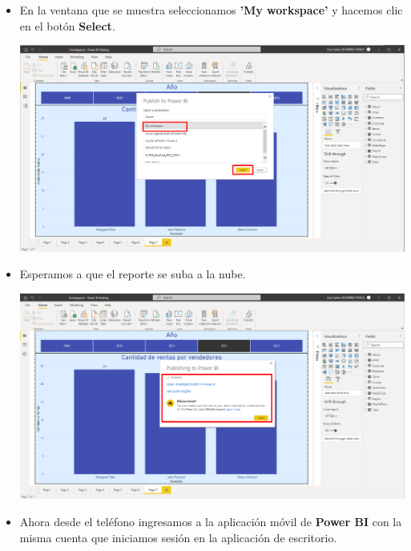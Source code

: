 \documentclass[12pt,letterpaper]{article}
\newcommand\tab[1][1cm]{\hspace*{#1}}
\begin{document}
\begin{enumerate}[\tab 1.]
\begin{itemize}
\begin{center}
            \end{center}
            \item En la ventana que se muestra seleccionamos \textbf{'My workspace'} y hacemos clic en el botón \textbf{Select}.
            \begin{center}
                \includegraphics[width=13cm]{./img/img25.5.png}
            \end{center}
            \item Esperamos a que el reporte se suba a la nube.
            \begin{center}
                \includegraphics[width=13cm]{./img/img25.6.png}
            \end{center}
            \item Ahora desde el teléfono ingresamos a la aplicación móvil de \textbf{Power BI} con la misma cuenta que iniciamos sesión en la aplicación de escritorio.
            \begin{center}

\end{center}
\end{itemize}
\end{enumerate}
\end{document}
